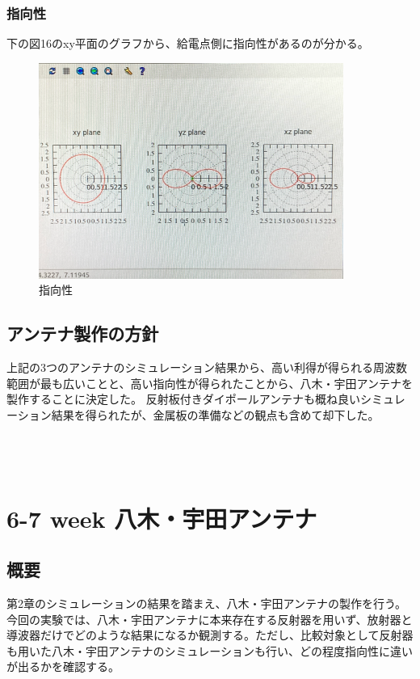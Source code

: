\documentclass[dvipdfmx,autodetect-engine,titlepage]{jsarticle}
\begin{document}
\subsubsection{指向性}
下の図16のxy平面のグラフから、給電点側に指向性があるのが分かる。\\
\begin{figure}[H]
  \centering
  \includegraphics[scale=0.6]{o3.png}
  \caption{指向性}\label{fig:図18}
\end{figure}

\subsection{アンテナ製作の方針}
上記の3つのアンテナのシミュレーション結果から、高い利得が得られる周波数範囲が最も広いことと、高い指向性が得られたことから、八木・宇田アンテナを製作することに決定した。
反射板付きダイポールアンテナも概ね良いシミュレーション結果を得られたが、金属板の準備などの観点も含めて却下した。\\\\\\\\

\section{6-7 week 八木・宇田アンテナ}
\subsection{概要}
第2章のシミュレーションの結果を踏まえ、八木・宇田アンテナの製作を行う。
今回の実験では、八木・宇田アンテナに本来存在する反射器を用いず、放射器と導波器だけでどのような結果になるか観測する。ただし、比較対象として反射器も用いた八木・宇田アンテナのシミュレーションも行い、どの程度指向性に違いが出るかを確認する。\\
\end{document}
